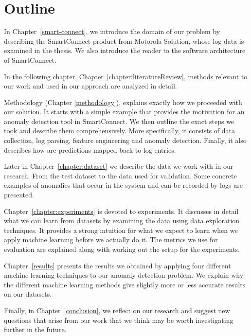 \section{Outline}
In Chapter~\ref{smart-connect}, we introduce the domain of our problem by describing the SmartConnect product from Motorola Solution, whose log data is examined in the thesis. We also introduce the reader to the software architecture of SmartConnect. 

In the following chapter, Chapter~\ref{chapter:literatureReview}, methods relevant to our work and used in our approach are analyzed in detail.

Methodology (Chapter \ref{methodology}), explains exactly how we proceeded with our solution. It starts with a simple example that provides the motivation for an anomaly detection tool in SmartConnect. We then outline the exact steps we took and describe them comprehensively. More specifically, it consists of data collection, log parsing, feature engineering and anomaly detection. Finally, it also describes how are predictions mapped back to log entries.

Later in Chapter~\ref{chapter:dataset} we describe the data we work with in our research. From the test dataset to the data used for validation. Some concrete examples of anomalies that occur in the system and can be recorded by logs are presented.

Chapter~\ref{chapter:experiments} is devoted to experiments. It discusses in detail what we can learn from datasets by examining the data using data exploration techniques.
It provides a strong intuition for what we expect to learn when we apply machine learning before we actually do it. 
The metrics we use for evaluation are explained along with working out the setup for the experiments.

Chapter~\ref{results} presents the results we obtained by applying four different machine learning techniques to our anomaly detection problem. We explain why the different machine learning methods give slightly more or less accurate results on our datasets.

Finally, in Chapter~\ref{conclusion}, we reflect on our research and suggest new questions that arise from our work that we think may be worth investigating further in the future.